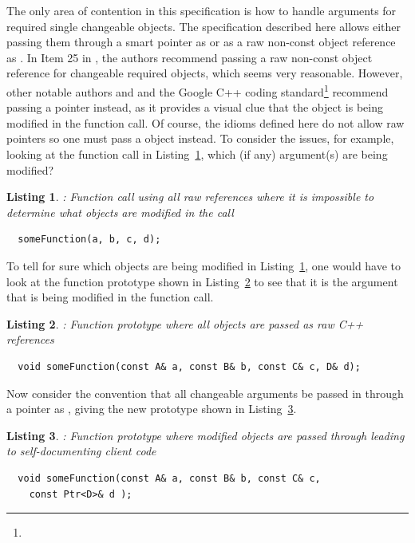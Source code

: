 \documentclass[pdf,ps2pdf,11pt]{SANDreport}
\newtheorem{listing}{Listing}
\begin{document}
The only area of contention in this specification is how to handle
arguments for required single changeable objects.  The specification
described here allows either passing them through a smart pointer as
{} or as a raw non-const object reference as
{}.  In Item 25 in {}\cite{C++CodingStandards05}, the authors
recommend passing a raw non-const object reference {} for
changeable required objects, which seems very reasonable.  However,
other notable authors {}\cite[Section Section 5.5]{stroustrup97} and
{}\cite[Section 13.2]{CodeComplete2nd04} and the Google C++ coding
standard\footnote{}
recommend passing a pointer instead, as it provides a visual clue that
the object is being modified in the function call.  Of course, the
idioms defined here do not allow raw pointers so one must pass a
{} object instead.  To consider the issues, for
example, looking at the function call in
Listing~\ref{listing:fun-call-raw-refs}, which (if any) argument(s)
are being modified?


{}\begin{listing}: Function call using all raw references where it is
impossible to determine what objects are modified in the call
\label{listing:fun-call-raw-refs}
{\small\begin{verbatim}
  someFunction(a, b, c, d);
\end{verbatim}}
\end{listing}


To tell for sure which objects are being modified in
Listing~\ref{listing:fun-call-raw-refs}, one would have to look at the
function prototype shown in Listing~\ref{listing:fun-decl-raw-refs} to
see that it is the {} argument that is being modified in the
function call.


{}\begin{listing}: Function prototype where all objects are passed as
raw C++ references
\label{listing:fun-decl-raw-refs}
{\small\begin{verbatim}
  void someFunction(const A& a, const B& b, const C& c, D& d);
\end{verbatim}}
\end{listing}


Now consider the convention that all changeable arguments be passed in
through a pointer as {}, giving the new prototype
shown in Listing~\ref{listing:fun-decl-ptr-changed-objs}.


{}\begin{listing}: Function prototype where modified objects are
passed through {} leading to self-documenting client code
\label{listing:fun-decl-ptr-changed-objs}
{\small\begin{verbatim}
  void someFunction(const A& a, const B& b, const C& c,
    const Ptr<D>& d );
\end{verbatim}}
\end{listing}
\end{document}
